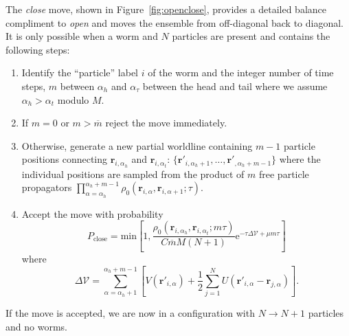 \documentclass[prb,10pt,aps,floatfix,notitlepage]{revtex4-1}
\renewcommand{\vec}[1]{\boldsymbol{#1}}
\newcommand{\e}[1]{\mathrm{e}^{#1}}
\begin{document}
\noindent
The \emph{close} move, shown in Figure~\ref{fig:openclose}, provides a detailed balance compliment to \emph{open} and
moves the ensemble from off-diagonal back to diagonal. It is only possible when
a worm and $N$ particles are present and contains the following steps:
\begin{enumerate}
    \item Identify the ``particle'' label $i$ of the worm and the integer number of time steps, $m$ between $\alpha_h$ and
        $\alpha_\tau$ between the head and tail where we assume $\alpha_h > \alpha_t$ modulo $M$.
\item If $m=0$ or $m> \overline{m}$ reject the move immediately.
\item Otherwise, generate a new partial worldline containing $m-1$ particle positions connecting 
    $\vec{r}_{i,\alpha_h}$ and $\vec{r}_{i,\alpha_t}$: $\{\vec{r}'_{i,\alpha_h+1},\ldots,
    \vec{r}'_{,\alpha_h+m-1}\}$ where the individual positions are sampled from
    the product of $m$ free particle propagators
    $\prod_{\alpha=\alpha_h}^{\alpha_h+m-1}
    \rho_0(\vec{r}_{i,\alpha},\vec{r}_{i,\alpha+1};\tau)$.
\item Accept the move with probability
\begin{equation}
    P_{\text{close}} = \mathrm{min} \left[1,
        \frac{\rho_0(\vec{r}_{i,\alpha_h},\vec{r}_{i,\alpha_t}; m \tau)}{C
    \overline{m}M (N+1)} \e{-\tau \Delta \mathcal{V} + \mu m \tau} \right]
\end{equation}
%
where
%
\begin{equation}
    \Delta\mathcal{V} = \sum_{\alpha=\alpha_h+1}^{\alpha_h+m-1} \left[ 
        V(\vec{r}'_{i,\alpha}) + \frac{1}{2}\sum_{j=1}^N
        U(\vec{r}'_{i,\alpha}-\vec{r}_{j,\alpha}) \right].
\end{equation}
%
\end{enumerate}
If the move is accepted, we are now in a configuration with $N \to N+1$
particles and no worms.
\end{document}
